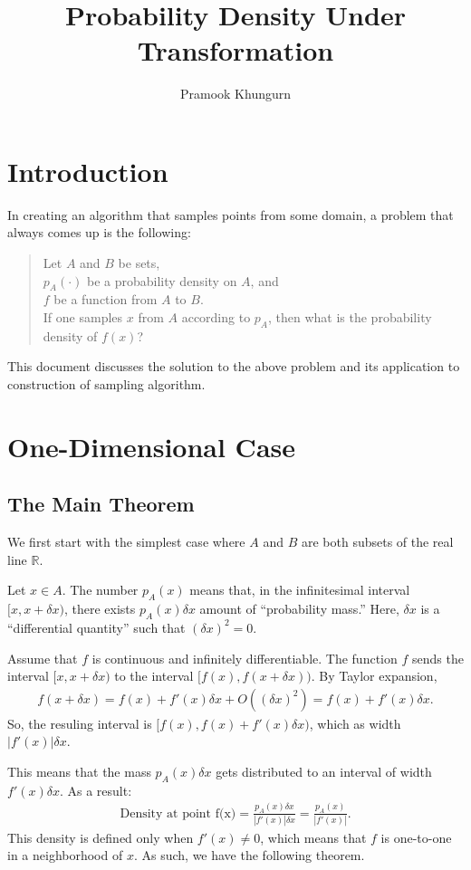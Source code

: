 \documentclass[10pt]{article}
\title{Probability Density Under Transformation}
\author{Pramook Khungurn}
\newcommand{\Real}{\mathbb{R}}
\begin{document}
  \maketitle

  \section{Introduction}

  In creating an algorithm that samples points from some domain, a problem that always comes up is the following:
  \begin{quote}
  	Let $A$ and $B$ be sets, \\
  	$p_A(\cdot)$ be a probability density on $A$, and\\
  	$f$ be a function from $A$ to $B$.\\
  	If one samples $x$ from $A$ according to $p_A$, then what is the probability density of $f(x)$?
  \end{quote}
  This document discusses the solution to the above problem and its application to construction of sampling algorithm.

  \section{One-Dimensional Case}
  \subsection{The Main Theorem}
  We first start with the simplest case where $A$ and $B$ are both subsets of the real line $\Real$.

  Let $x \in A$.  The number $p_A(x)$ means that, in the infinitesimal interval $[x, x+\delta x)$, there exists $p_A(x) \delta x$ amount of ``probability mass.''  Here, $\delta x$ is a ``differential quantity'' such that $(\delta x)^2 = 0$.

  Assume that $f$ is continuous and infinitely differentiable.  The function $f$ sends the interval $[x, x+\delta x)$ to the interval $[f(x), f(x+\delta x)).$  By Taylor expansion,
  \begin{align*}
  	f(x + \delta x) = f(x) + f'(x) \delta x + O((\delta x)^2) = f(x) + f'(x) \delta x.
  \end{align*}
  So, the resuling interval is $[f(x), f(x) + f'(x) \delta x)$, which as width $|f'(x)| \delta x$.

  This means that the mass $p_A(x) \delta x$ gets distributed to an interval of width $f'(x) \delta x$.  As a result:
  \begin{align*}
  	\mbox{Density at point f(x)} = \frac{p_A(x) \delta x}{|f'(x)| \delta x} = \frac{p_A(x)}{|f'(x)|}.
  \end{align*}
  This density is defined only when $f'(x) \neq 0$, which means that $f$ is one-to-one in a neighborhood of $x$.  As such, we have the following theorem.
\end{document}
